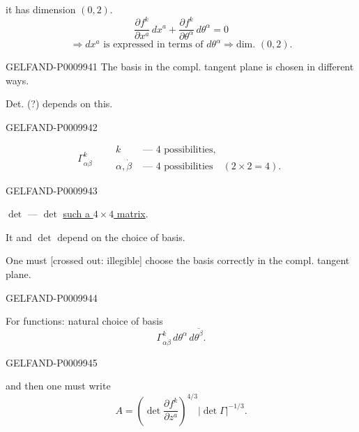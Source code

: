 it has dimension $(0,2)$.
\[
\frac{\partial f^k}{\partial x^a}\,dx^a+
\frac{\partial f^k}{\partial\theta^\alpha}\,d\theta^\alpha=0
\]
\[
\Rightarrow dx^a\text{ is expressed in terms of }d\theta^\alpha
\Rightarrow \text{dim. }(0,2).
\]


\begin{GelfandAdjacentEvidence}{GELFAND-P000994}{1}
The basis in the compl. tangent plane is chosen in different ways.

Det. (?) depends on this.
\end{GelfandAdjacentEvidence}
\begin{GelfandAdjacentEvidence}{GELFAND-P000994}{2}

\[
\Gamma^k_{\alpha\dot\beta}
\qquad
\begin{aligned}
k&\text{ --- 4 possibilities},\\
\alpha,\dot\beta&\text{ --- 4 possibilities}\quad(2\times2=4).
\end{aligned}
\]
\end{GelfandAdjacentEvidence}
\begin{GelfandAdjacentEvidence}{GELFAND-P000994}{3}

\underline{\underline{$\det$}} --- $\det$ \underline{such a $4\times4$ matrix}.

It and $\det$ depend on the choice of basis.

One must [crossed out: illegible] choose the basis correctly in the compl. tangent plane.
\end{GelfandAdjacentEvidence}
\begin{GelfandAdjacentEvidence}{GELFAND-P000994}{4}


For functions: natural choice of basis
\[
\Gamma^k_{\alpha\dot\beta}\,d\theta^\alpha\,d\overline{\theta^\beta}.
\]
\end{GelfandAdjacentEvidence}
\begin{GelfandAdjacentEvidence}{GELFAND-P000994}{5}


and then one must write
\[
A=\left(\det\frac{\partial f^k}{\partial z^a}\right)^{4/3}
|\det\Gamma|^{-1/3}.
\]
\end{GelfandAdjacentEvidence}
